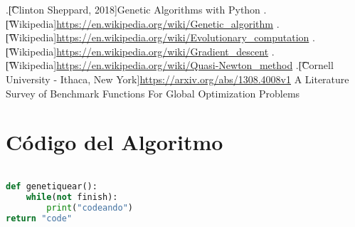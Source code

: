 \documentclass[10pt]{article}
\begin{document}
\begin{thebibliography}{99} %
.\t[Clinton Sheppard, 2018]{}Genetic Algorithms with Python
.\t[Wikipedia]{}\url{https://en.wikipedia.org/wiki/Genetic_algorithm}
.\t[Wikipedia]{}\url{https://en.wikipedia.org/wiki/Evolutionary_computation}
.\t[Wikipedia]{}\url{https://en.wikipedia.org/wiki/Gradient_descent}
.\t[Wikipedia]{}\url{https://en.wikipedia.org/wiki/Quasi-Newton_method}
.\t[Cornell University - Ithaca, New York]{}\url{https://arxiv.org/abs/1308.4008v1} A Literature Survey of Benchmark Functions For Global Optimization Problems




\end{thebibliography} 
 
\section{Código del Algoritmo}
\begin{lstlisting}[language=Python]

def genetiquear():
	while(not finish):
		print("codeando")
return "code"

\end{lstlisting}
\newpage
\tableofcontents
\end{document}
